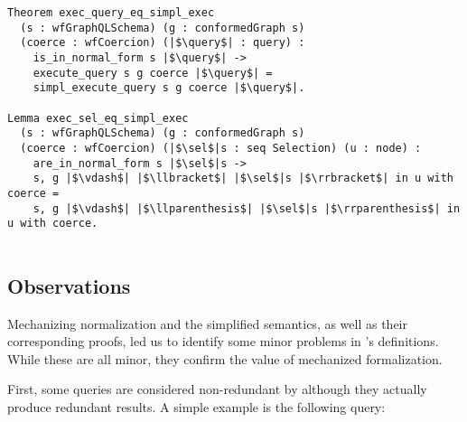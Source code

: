 \begin{verbatim}
Theorem exec_query_eq_simpl_exec 
  (s : wfGraphQLSchema) (g : conformedGraph s)
  (coerce : wfCoercion) (|$\query$| : query) : 
    is_in_normal_form s |$\query$| -> 
    execute_query s g coerce |$\query$| =
    simpl_execute_query s g coerce |$\query$|.
    
Lemma exec_sel_eq_simpl_exec
  (s : wfGraphQLSchema) (g : conformedGraph s) 
  (coerce : wfCoercion) (|$\sel$|s : seq Selection) (u : node) :
    are_in_normal_form s |$\sel$|s -> 
    s, g |$\vdash$| |$\llbracket$| |$\sel$|s |$\rrbracket$| in u with coerce =
    s, g |$\vdash$| |$\llparenthesis$| |$\sel$|s |$\rrparenthesis$| in u with coerce.
 
\end{verbatim}

 
\subsection{Observations}\label{subsec:norm_lims}

Mechanizing normalization and the simplified semantics, as well as their corresponding proofs, led us to identify some minor problems in \HP's definitions. While these are all minor, they confirm the value of mechanized formalization.

First, some queries are considered non-redundant by \HP although they actually produce redundant results.
A simple example is the following query:

